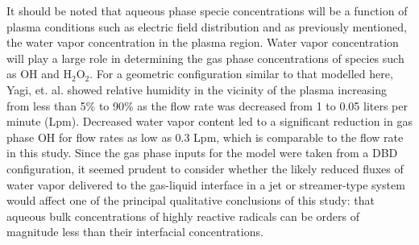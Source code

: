It should be noted that aqueous phase specie concentrations will be a function of plasma conditions such as electric field distribution and as previously mentioned, the water vapor concentration in the plasma region. Water vapor concentration will play a large role in determining the gas phase concentrations of species such as OH and H$_2$O$_2$. For a geometric configuration similar to that modelled here, Yagi, et. al. \cite{yagi2015two} showed relative humidity in the vicinity of the plasma increasing from less than 5\% to 90\% as the flow rate was decreased from 1 to 0.05 liters per minute (Lpm). Decreased water vapor content led to a significant reduction in gas phase OH for flow rates as low as 0.3 Lpm, which is comparable to the flow rate in this study. Since the gas phase inputs for the model were taken from a DBD configuration, it seemed prudent to consider whether the likely reduced fluxes of water vapor delivered to the gas-liquid interface in a jet or streamer-type system would affect one of the principal qualitative conclusions of this study: that aqueous bulk concentrations of highly reactive radicals can be orders of magnitude less than their interfacial concentrations.

